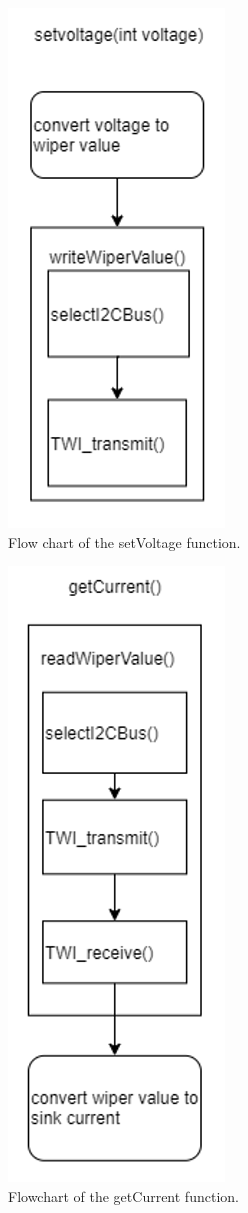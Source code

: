 \begin{figure}[ht!]
    \centering
    \includegraphics[scale=0.7]{software_setVoltage_flow_chart.png}
    \caption{Flow chart of the setVoltage function.}
    \label{fig:setvoltage}
\end{figure}
\FloatBarrier
\begin{figure}[ht!]
    \centering
    \includegraphics[scale=0.7]{software_getCurrent_flow_chart.png}
    \caption{Flowchart of the getCurrent function.}
    \label{fig:getcurrent}
\end{figure}
